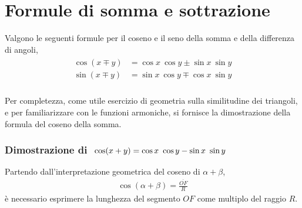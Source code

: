 \documentclass[letterpaper,10pt,english]{jupyterBook}
\begin{document}
\sphinxAtStartPar
{}


\section{Formule di somma e sottrazione}
\label{\detokenize{ch/trigonometry:formule-di-somma-e-sottrazione}}
\sphinxAtStartPar
Valgono le seguenti formule per il coseno e il seno della somma e della differenza di angoli,
\begin{equation*}
\begin{split}\begin{aligned}
  \cos ( x \mp y ) & = \cos x \ \cos y \pm \sin x \ \sin y \\
  \sin ( x \mp y ) & = \sin x \ \cos y \mp \cos x \ \sin y \\
\end{aligned}\end{split}
\end{equation*}
\sphinxAtStartPar
{}

\sphinxAtStartPar
Per completezza, come utile esercizio di geometria sulla similitudine dei triangoli, e per familiarizzare con le funzioni armoniche, si fornisce la dimostrazione della formula del coseno della somma.
\subsubsection*{Dimostrazione di \protect\(\ \cos ( x + y ) = \cos x \ \cos y - \sin x \ \sin y\protect\)}

\sphinxAtStartPar
Partendo dall’interpretazione geometrica del coseno di \(\alpha + \beta\),
\begin{equation*}
\begin{split}\cos ( \alpha + \beta ) = \frac{\overline{OF}}{R}\end{split}
\end{equation*}
\sphinxAtStartPar
è necessario esprimere la lunghezza del segmento \(OF\) come multiplo del raggio \(R\).
\end{document}
